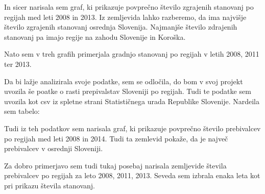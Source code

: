 \documentclass[11pt,a4paper]{article}
\begin{document}
In sicer narisala sem graf, ki prikazuje povprečno število zgrajenih stanovanj po regijah med leti 2008 in 2013. Iz zemljevida lahko razberemo, da ima najvišje število zgrajenih stanovanj osrednja Slovenija. Najmanjše število zdrajenih stanovanj pa imajo regije na zahodu Slovenije in Koroška.


Nato sem v treh grafih primerjala gradnjo stanovanj po regijah v letih 2008, 2011 ter 2013.

\vspace{5mm}
\vspace{5mm}

Da bi lažje analizirala svoje podatke, sem se odločila, do bom v svoj projekt uvozila še poatke o rasti prepivalstav Sloveniji po regijah. Tudi te podatke sem uvozila kot csv iz spletne strani Statističnega urada Republike Slovenije. Nardeila sem tabelo:



Tudi iz teh podatkov sem narisala graf, ki prikazuje povprečno število prebivalcev po regijah med leti 2008 in 2014. Tudi ta zemlevid pokaže, da je največ prebivalcev v osrednji Sloveniji.


Za dobro primerjavo sem tudi tukaj posebaj narisala zemljevide števila prebivalcev po regijah za leto 2008, 2011, 2013. Seveda sem izbrala enaka leta kot pri prikazu števila stanovanj.

\vspace{5mm}
\vspace{5mm}



\end{document}
